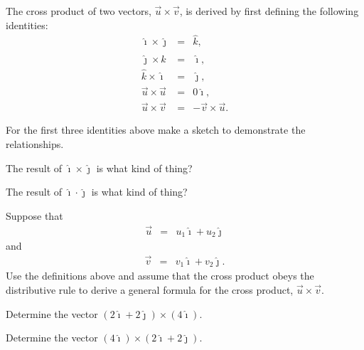 \begin{problem}
\item The cross product of two vectors, $\vec{u}\times\vec{v}$, is
  derived by first defining  the following identities:
  \begin{eqnarray*}
    \hat{\imath} \times \hat{\jmath} & = & \hat{k}, \\
    \hat{\jmath} \times \hat{k} & = & \hat{\imath}, \\
    \hat{k} \times \hat{\imath} & = & \hat{\jmath}, \\
    \vec{u} \times \vec{u} & = & 0 \hat{\imath}, \\
    \vec{u} \times \vec{v} & = & - \vec{v} \times \vec{u}.
  \end{eqnarray*}
  \begin{subproblem}
  \item For the first three identities above make a sketch to
    demonstrate the relationships.
    \vfill

    \item The result of $\hat{\imath}\times\hat{\jmath}$ is what kind of thing?
    \vspace{3em}

    \item The result of $\hat{\imath}\cdot\hat{\jmath}$ is what kind of thing?
    \vspace{3em}

    \clearpage

  \item Suppose that
    \begin{eqnarray*}
      \vec{u} & = & u_1 \hat{\imath} + u_2 \hat{\jmath}
    \end{eqnarray*}
    and
    \begin{eqnarray*}
      \vec{v} & = & v_1 \hat{\imath} + v_2 \hat{\jmath}.
    \end{eqnarray*}
    Use the definitions above and assume that the cross product obeys
    the distributive rule to derive a general formula for the cross
    product, $\vec{u}\times\vec{v}$.
    \vfill
    \vfill

    \clearpage

  \item Determine the vector $\left(2 \hat{\imath} + 2\hat{\jmath}\right) \times \left(4 \hat{\imath}\right)$.
    \vfill

  \item Determine the vector $\left( 4 \hat{\imath} \right)  \times  \left( 2 \hat{\imath} + 2\hat{\jmath}\right)$.
    \vfill


\end{subproblem}
\end{problem}
